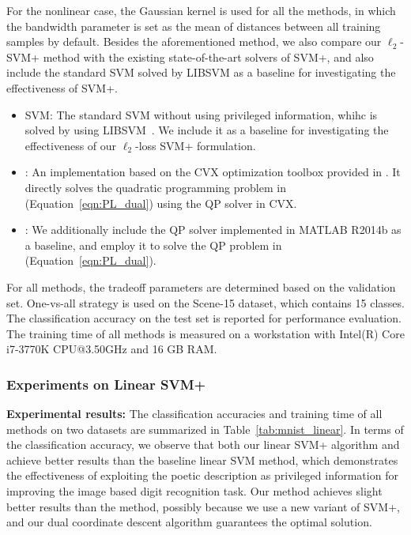 For the nonlinear case, the Gaussian kernel is used for all the
methods, in which the bandwidth parameter is set as the mean of
distances between all training samples by default. Besides the
aforementioned \casmo method, we also compare our $\ell_2$-SVM+ method
with the existing state-of-the-art solvers of SVM+, and also include
the standard SVM solved by LIBSVM as a baseline for investigating the
effectiveness of SVM+.
\begin{itemize}
\setlength\itemsep{-2pt}
\item SVM: The standard SVM without using privileged information, whihc is solved by using LIBSVM~\citep{liblinear}. We include it as a baseline for investigating the effectiveness of our $\ell_2$-loss SVM+ formulation.
\item \cvx: An implementation based on the CVX optimization toolbox
  provided in \citep{MTLSVMPLUS}. It directly solves the quadratic
  programming problem in (Equation~\ref{eqn:PL_dual}) using the QP solver in
  CVX.
\item \matlab: We additionally include the QP solver implemented in MATLAB R2014b as a baseline, and employ it to solve the QP problem in (Equation~\ref{eqn:PL_dual}).
\end{itemize}

For all methods, the tradeoff parameters are determined based on the
validation set. One-vs-all strategy is used on the Scene-15 dataset,
which contains 15 classes. The classification accuracy on the test set
is reported for performance evaluation. The training time of all
methods is measured on a workstation with Intel(R) Core i7-3770K
CPU@3.50GHz and 16 GB RAM.

\subsubsection{Experiments on Linear SVM+}
\textbf{Experimental results:} The classification accuracies and
training time of all methods on two datasets are summarized in
Table~\ref{tab:mnist_linear}. In terms of the classification accuracy,
we observe that both our linear SVM+ algorithm and \casmo achieve
better results than the baseline linear SVM method, which demonstrates
the effectiveness of exploiting the poetic description as privileged
information for improving the image based digit recognition task. Our
method achieves slight better results than the \casmo method, possibly
because we use a new variant of SVM+, and our dual coordinate descent
algorithm guarantees the optimal solution.


